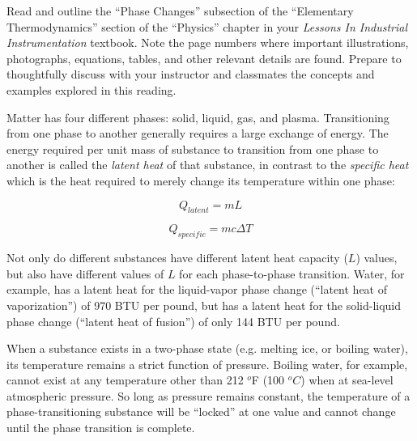 

Read and outline the ``Phase Changes'' subsection of the ``Elementary Thermodynamics'' section of the ``Physics'' chapter in your {\it Lessons In Industrial Instrumentation} textbook.  Note the page numbers where important illustrations, photographs, equations, tables, and other relevant details are found.  Prepare to thoughtfully discuss with your instructor and classmates the concepts and examples explored in this reading.














Matter has four different phases: solid, liquid, gas, and plasma.  Transitioning from one phase to another generally requires a large exchange of energy.  The energy required per unit mass of substance to transition from one phase to another is called the {\it latent heat} of that substance, in contrast to the {\it specific heat} which is the heat required to merely change its temperature within one phase:

$$Q_{latent} = mL$$

$$Q_{specific} = mc \Delta T$$

Not only do different substances have different latent heat capacity ($L$) values, but also have different values of $L$ for each phase-to-phase transition.  Water, for example, has a latent heat for the liquid-vapor phase change (``latent heat of vaporization'') of 970 BTU per pound, but has a latent heat for the solid-liquid phase change (``latent heat of fusion'') of only 144 BTU per pound.

\vskip 10pt

When a substance exists in a two-phase state (e.g. melting ice, or boiling water), its temperature remains a strict function of pressure.  Boiling water, for example, cannot exist at any temperature other than 212 $^{o}$F (100 $^{o}C$) when at sea-level atmospheric pressure.  So long as pressure remains constant, the temperature of a phase-transitioning substance will be ``locked'' at one value and cannot change until the phase transition is complete.

